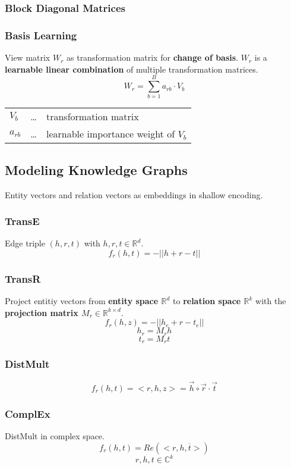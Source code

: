 \documentclass[parskip=full]{scrartcl}
\begin{document}
\subsubsection{Block Diagonal Matrices}

\subsubsection{Basis Learning}
View matrix $W_r$ as transformation matrix for \textbf{change of basis}. $W_r$ is a \textbf{learnable linear combination} of multiple transformation matrices.
\[W_r = \sum_{b=1}^{B} a_{rb} \cdot V_b\]
\begin{center}
\begin{tabular}{l c l}
	$V_b$ & \dots & transformation matrix \\
	$a_{rb}$ & \dots & learnable importance weight of $V_b$
\end{tabular}
\end{center}

\subsection{Modeling Knowledge Graphs}
Entity vectors and relation vectors as embeddings in shallow encoding.

\subsubsection{TransE \cite{Bordes2013TranslatingEF}}
Edge triple $(h,r,t)$ with $h,r,t \in \mathbb{R}^d$.
\[f_r(h,t) = - \vert \vert h + r - t \vert \vert\]

\subsubsection{TransR \cite{Lin2015LearningEA}}
Project entitiy vectors from \textbf{entity space $\mathbb{R}^d$} to \textbf{relation space $\mathbb{R}^k$} with the \textbf{projection matrix $M_r \in \mathbb{R}^{k \times d}$}.
\[f_r(h,z) = - \vert \vert h_e + r - t_e \vert \vert\]
\[h_r = M_rh\]
\[t_r = M_rt\]

\subsubsection{DistMult \cite{yang2015embedding}}
\[f_r(h,t) = <r,h,z> = \vec{h} \circ \vec{r} \cdot \vec{t}\]

\subsubsection{ComplEx \cite{trouillon2016complex}}
DistMult in complex space.
\[f_r(h,t) = Re(<r,h,\overline{t}>)\]
\[r,h,t \in \mathbb{C}^k\]
\end{document}
